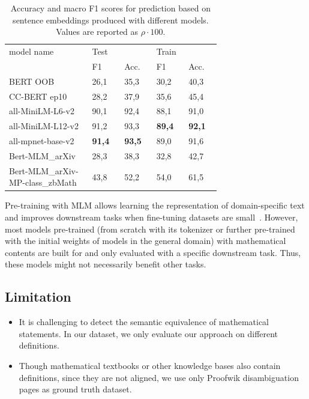 \begin{table}
    \centering
    \caption{Accuracy and macro F1 scores for prediction based on sentence embeddings produced with different models. Values are reported as $\rho \cdot 100$.}
    \begin{tabular}{|p{0.3\linewidth}|p{0.1\linewidth}|p{0.1\linewidth}|p{0.1\linewidth}|p{0.1\linewidth}|}
    \hline
        model name& \multicolumn{2}{l|}{Test} & \multicolumn{2}{l|}{Train}\\ \cline{2-5}
         & F1 & Acc. & F1 & Acc. \\ \hline
        BERT OOB & 26,1 & 35,3 & 30,2 & 40,3 \\ \hline
        CC-BERT ep10 & 28,2 & 37,9 & 35,6 & 45,4 \\ \hline
        all-MiniLM-L6-v2 & 90,1 & 92,4 & 88,1 & 91,0 \\ \hline
        all-MiniLM-L12-v2 & 91,2 & 93,3 & \textbf{89,4} & \textbf{92,1} \\ \hline
        all-mpnet-base-v2 & \textbf{91,4} & \textbf{93,5} & 89,0 & 91,6 \\ \hline
        Bert-MLM\_arXiv & 28,3 & 38,3 & 32,8 & 42,7 \\ \hline
        Bert-MLM\_arXiv-MP-class\_zbMath & 43,8 & 52,2 & 54,0 & 61,5 \\ \hline
    \end{tabular}
    \label{tab:sim_scores}
\end{table}

Pre-training with MLM allows learning the representation of domain-specific text and improves downstream tasks when fine-tuning datasets are small~\cite{mishraPS21,jiang2022choubert}. However, most models pre-trained (from scratch with its tokenizer or further pre-trained with the initial weights of models in the general domain) with mathematical contents are built for and only evaluated with a specific downstream task. Thus, these models might not necessarily benefit other tasks.


\subsection{Limitation}
\label{sec:eval}
\begin{itemize}
    \item It is challenging to detect the semantic equivalence of mathematical statements. In our dataset, we only evaluate our approach on different definitions. 
    \item Though mathematical textbooks or other knowledge bases also contain definitions, since they are not aligned, we use only Proofwik disambiguation pages as ground truth dataset.
\end{itemize}


